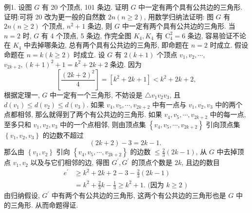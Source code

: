 例1. 设图 $G$ 有 20 个顶点, 101 条边.
证明 $G$ 中一定有两个具有公共边的三角形.
证明:可将 20 改为更一般的自然数 $2 n(n \geqslant 2)$, 用数学归纳法证明: 图 $G$ 有 $2 n(n \geqslant 2)$ 个顶点, $n^2+1$ 条边, 则 $G$ 中一定有两个具有公共边的三角形.
当 $n=2$ 时, $G$ 有 4 个顶点, 5 条边, 作完全图 $K_4, K_4$ 有 $\mathrm{C}_4^2=6$ 条边, 容易验证不论在 $K_4$ 中去掉哪条边, 总有两个具有公共边的三角形, 即命题在 $n=2$ 时成立.
假设命题在 $n=k(k \geqslant 2)$ 时成立.
设 $G$ 有 $2(k+1)$ 个顶点 $v_1, v_2, \cdots$, $v_{2 k+2},(k+1)^2+1=k^2+2 k+2$ 条边.
因为
$$
\left[\frac{(2 k+2)^2}{4}\right]=\left[k^2+2 k+1\right]<k^2+2 k+2,
$$
根据定理一, $G$ 中一定有一个三角形, 不妨设是 $\triangle v_1 v_2 v_3$, 且 $d\left(v_1\right) \leqslant d\left(v_2\right) \leqslant d\left(v_3\right)$.
如果 $v_4, v_5, \cdots, v_{2 k+2}$ 中有一点与 $v_1, v_2, v_3$ 中的两个点都相邻, 那么就得到了两个有公共边的三角形.
如果 $v_4, v_5, \cdots, v_{2 k+2}$ 中的每一点, 至多只和 $v_1, v_2, v_3$ 中的一个点相邻, 则由顶点集 $\left\{v_4, v_5, \cdots, v_{2 k+2}\right\}$ 引向顶点集 $\left\{v_1, v_2, v_3\right\}$ 的边数不超过
$$
(2 k+2)-3=2 k-1 \text {. }
$$
那么由 $\left\{v_1, v_2\right\}$ 引向 $\left\{v_4, v_5, \cdots, v_{2 k+2}\right\}$ 的边数 $\leqslant \frac{2}{3}(2 k-1)$, 从 $G$ 中去掉顶点 $v_1, v_2$ 以及与它们相邻的边, 得图 $G^{\prime}, G^{\prime}$ 的顶点个数是 $2 k$, 且边的数目
$$
\begin{aligned}
e^{\prime} & \geqslant k^2+2 k+2-3-\frac{2}{3}(2 k-1) \\
& =k^2+\frac{2}{3} k-\frac{1}{3} \geqslant k^2+1 . \text { (因为 } k \geqslant 2 \text { ) }
\end{aligned}
$$
由归纳假设, $G^{\prime}$ 中有两个有公共边的三角形, 这两个有公共边的三角形也是 $G$ 中的三角形.
从而命题得证.



